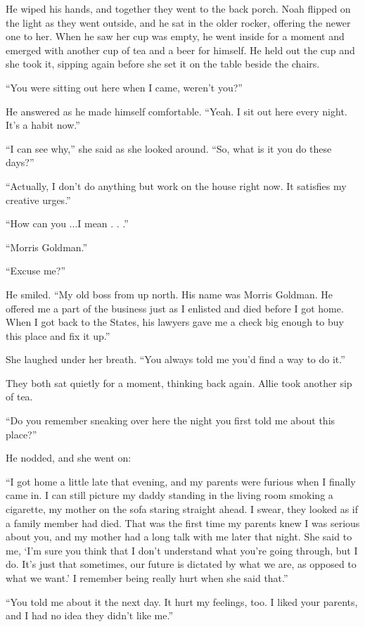 \documentclass[10pt, twoside, openright]{book}
\begin{document}
He wiped his hands, and together they went to the back porch. Noah
flipped on the light as they went outside, and he sat in the older
rocker, offering the newer one to her. When he saw her cup was empty, he
went inside for a moment and emerged with another cup of tea and a beer
for himself. He held out the cup and she took it, sipping again before
she set it on the table beside the chairs.


``You were sitting out here when I came, weren't you?''


He answered as he made himself comfortable. ``Yeah. I sit out here every
night. It's a habit now.''

``I can see why,'' she said as she looked around. ``So, what is it you
do these days?''

``Actually, I don't do anything but work on the house right now. It
satisfies my creative urges.''


``How can you ...I mean . . .''

``Morris Goldman.''

``Excuse me?''


He smiled. ``My old boss from up north. His name was Morris Goldman. He
offered me a part of the business just as I enlisted and died before I
got home. When I got back to the States, his lawyers gave me a check big
enough to buy this place and fix it up.''

She laughed under her breath. ``You always told me you'd find a way to
do it.''

They both sat quietly for a moment, thinking back again. Allie took
another sip of tea.

``Do you remember sneaking over here the night you first told me about
this place?''


He nodded, and she went on:


``I got home a little late that evening, and my parents were furious
when I finally came in. I can still picture my daddy standing in the
living room smoking a cigarette, my mother on the sofa staring straight
ahead. I swear, they looked as if a family member had died. That was the
first time my parents knew I was serious about you, and my mother had a
long talk with me later that night. She said to me, `I'm sure you think
that I don't understand what you're going through, but I do. It's just
that sometimes, our future is dictated by what we are, as opposed to
what we want.' I remember being really hurt when she said that.''

``You told me about it the next day. It hurt my feelings, too. I liked
your parents, and I had no idea they didn't like me.''
\end{document}
